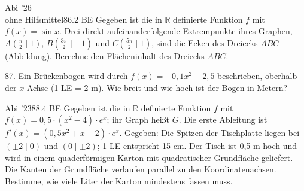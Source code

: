 \documentclass[11pt]{article}
\begin{document}
\begin{pfaufg}{Abi ’26\\ohne Hilfsmittel}{86.}{2 BE}
Gegeben ist die in $\mathbb{R}$ definierte Funktion $f$ mit $f(x) = \sin x$. Drei direkt aufeinanderfolgende Extrempunkte ihres Graphen, $A\left(\tfrac{\pi}{2} \mid 1\right)$, $B\left(\tfrac{3\pi}{2} \mid -1\right)$ und $C\left(\tfrac{5\pi}{2} \mid 1\right)$, sind die Ecken des Dreiecks $ABC$ (Abbildung). Berechne den Flächeninhalt des Dreiecks $ABC$.
\par\smallskip\noindent {}\par
{}
\end{pfaufg}
\pfgruppe{}
\begin{pfaufg}{}{87.}{}
Ein Brückenbogen wird durch $f(x) = -0{,}1x^2 + 2{,}5$ beschrieben, oberhalb der $x$-Achse (1 LE = 2 m). Wie breit und wie hoch ist der Bogen in Metern?
\end{pfaufg}
\begin{pfaufg}{Abi ’23}{88.}{4 BE}
Gegeben ist die in $\mathbb{R}$ definierte Funktion $f$ mit $f(x) = 0{,}5\cdot(x^2 - 4)\cdot e^x$; ihr Graph heißt $G$. Die erste Ableitung ist $f'(x) = (0{,}5x^2 + x - 2)\cdot e^x$. Gegeben: Die Spitzen der Tischplatte liegen bei $(\pm 2 \mid 0)$ und $(0 \mid \pm 2)$; 1 LE entspricht 15 cm. Der Tisch ist 0,5 m hoch und wird in einem quaderförmigen Karton mit quadratischer Grundfläche geliefert. Die Kanten der Grundfläche verlaufen parallel zu den Koordinatenachsen. Bestimme, wie viele Liter der Karton mindestens fassen muss.
\end{pfaufg}
\end{document}
